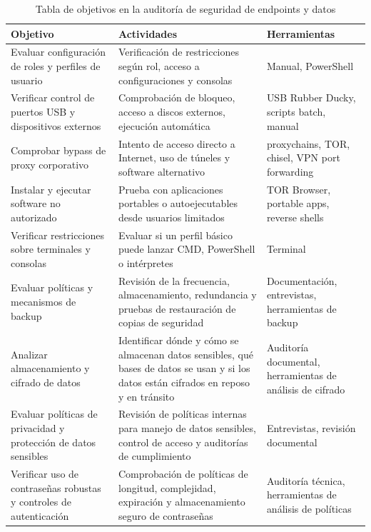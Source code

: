 \documentclass[a4paper, 11pt]{article}
\begin{document}
\begin{table}[H]
\centering
\renewcommand{\arraystretch}{1.4}
\begin{tabular}{|p{4.2cm}|p{6.3cm}|p{4.5cm}|}
\hline
\textbf{Objetivo} & \textbf{Actividades} & \textbf{Herramientas} \\
\hline
Evaluar configuración de roles y perfiles de usuario & Verificación de restricciones según rol, acceso a configuraciones y consolas & Manual, PowerShell \\
\hline
Verificar control de puertos USB y dispositivos externos & Comprobación de bloqueo, acceso a discos externos, ejecución automática & USB Rubber Ducky, scripts batch, manual \\
\hline
Comprobar bypass de proxy corporativo & Intento de acceso directo a Internet, uso de túneles y software alternativo & proxychains, TOR, chisel, VPN port forwarding \\
\hline
Instalar y ejecutar software no autorizado & Prueba con aplicaciones portables o autoejecutables desde usuarios limitados & TOR Browser, portable apps, reverse shells \\
\hline
Verificar restricciones sobre terminales y consolas & Evaluar si un perfil básico puede lanzar CMD, PowerShell o intérpretes & Terminal \\
\hline
Evaluar políticas y mecanismos de backup & Revisión de la frecuencia, almacenamiento, redundancia y pruebas de restauración de copias de seguridad & Documentación, entrevistas, herramientas de backup \\
\hline
Analizar almacenamiento y cifrado de datos & Identificar dónde y cómo se almacenan datos sensibles, qué bases de datos se usan y si los datos están cifrados en reposo y en tránsito & Auditoría documental, herramientas de análisis de cifrado \\
\hline
Evaluar políticas de privacidad y protección de datos sensibles & Revisión de políticas internas para manejo de datos sensibles, control de acceso y auditorías de cumplimiento & Entrevistas, revisión documental \\
\hline
Verificar uso de contraseñas robustas y controles de autenticación & Comprobación de políticas de longitud, complejidad, expiración y almacenamiento seguro de contraseñas & Auditoría técnica, herramientas de análisis de políticas \\
\hline
\end{tabular}
\caption{Tabla de objetivos en la auditoría de seguridad de endpoints y datos}
\end{table}
\end{document}
